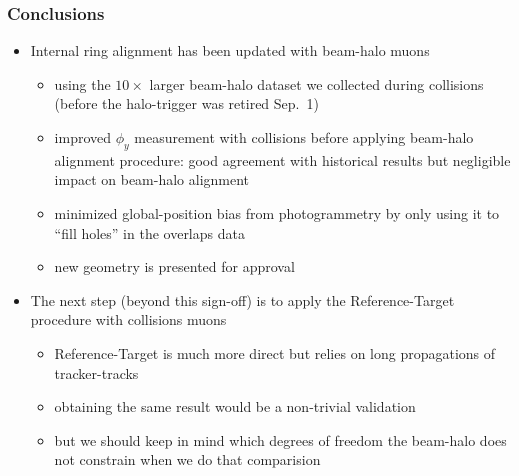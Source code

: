 \documentclass[compress]{beamer}
\begin{document}

\begin{frame}
\frametitle{Conclusions}
\begin{itemize}
\item Internal ring alignment has been updated with beam-halo muons
\begin{itemize}
\item using the $10\times$ larger beam-halo dataset we collected
  during collisions (before the halo-trigger was retired
  Sep.~1)
\item improved $\phi_y$ measurement with collisions before applying
  beam-halo alignment procedure: good agreement with historical
  results but negligible impact on beam-halo alignment
\item minimized global-position bias from photogrammetry by only using
  it to ``fill holes'' in the overlaps data
\item new geometry is presented for approval
\end{itemize}

\item The next step (beyond this sign-off) is to apply the
  Reference-Target procedure with collisions muons
\begin{itemize}
\item Reference-Target is much more direct but relies on long propagations of tracker-tracks
\item obtaining the same result would be a non-trivial validation
\item but we should keep in mind which degrees of freedom the
  beam-halo does not constrain when we do that comparision
\end{itemize}

\end{itemize}
\label{numpages}
\end{frame}
\end{document}
